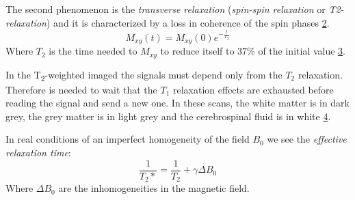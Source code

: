  \begin{figure}[h]
    \centering
    \caption{}
    \label{fig:T1_relax_tissues}
 \end{figure}

 The second phenomenon is the \emph{transverse relaxation} (\emph{spin-spin relaxation} or \emph{T2-relaxation}) and it is characterized by a loss in coherence of the spin phases \ref{fig:T2_relax_phases}.
 \begin{equation}
    M_{xy}(t)=M_{xy}(0)e^{-\frac{t}{T_{2}}}
 \end{equation}
 Where $T_2$ is the time needed to $M_{xy}$ to reduce itself to $37\%$ of the initial value \ref{fig:T2_relax}.

 \begin{figure}[h]
    \centering
    \caption{}
    \label{fig:T2_relax_phases}
 \end{figure}

 \begin{figure}[h]
    \centering
    \caption{}
    \label{fig:T2_relax}
 \end{figure}

 In the T\textsubscript{2}-weighted imaged the signals must depend only from the $T_2$ relaxation. Therefore is needed to wait that the $T_1$ relaxation effects are exhausted before reading the signal and send a new one. In these scans, the white matter is in dark grey, the grey matter is in light grey and the cerebrospinal fluid is in white \ref{fig:T2_relax_tissues}.

 \begin{figure}[h]
    \centering
    \caption{}
    \label{fig:T2_relax_tissues}
 \end{figure}

 In real conditions of an imperfect homogeneity of the field $B_0$ we see the \emph{effective relaxation time}:
 \begin{equation}
    \frac{1}{T_{2}*} = \frac{1}{T_2}+\gamma\Delta B_0
 \end{equation}
 Where $\Delta B_0$ are the inhomogeneities in the magnetic field.

